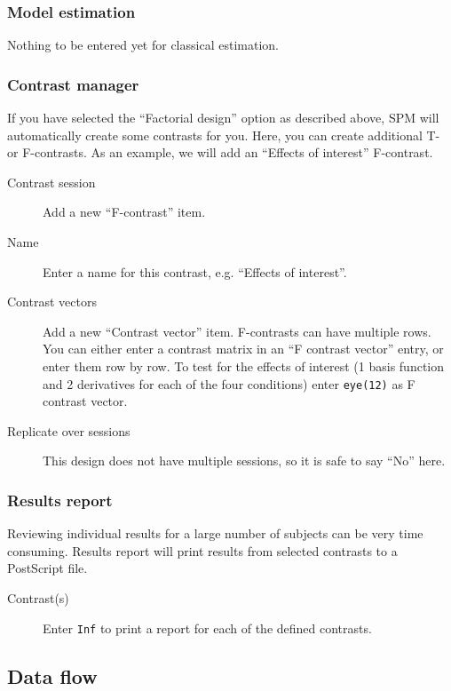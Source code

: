 \documentclass[a4paper]{book}
\begin{document}
\subsubsection*{Model estimation}

Nothing to be entered yet for classical estimation.

\subsubsection*{Contrast manager} 

If you have selected the ``Factorial design'' option as described above, SPM
will automatically create some contrasts for you. Here, you can create
additional T- or F-contrasts. As an example, we will add an ``Effects of
interest'' F-contrast. 

\begin{description}
\item[Contrast session] Add a new ``F-contrast'' item.
\item[Name] Enter a name for this contrast, e.g. ``Effects of interest''.
\item[Contrast vectors] Add a new ``Contrast vector'' item. F-contrasts
  can have multiple rows. You can either enter a contrast matrix in an ``F
  contrast vector'' entry, or enter them row by row. To test for the
  effects of interest (1 basis function and 2 derivatives for each of the
  four conditions) enter \verb|eye(12)| as F contrast vector.
\item[Replicate over sessions] This design does not have multiple
  sessions, so it is safe to say ``No'' here.
\end{description}

\subsubsection*{Results report}

Reviewing individual results for a large number of subjects can be very time
consuming. Results report will print results from selected contrasts to a
PostScript file. 
  
\begin{description}
\item[Contrast(s)] Enter \verb|Inf| to print a report for each of the
  defined contrasts.
\end{description}

\subsection{Data flow}
\end{document}

